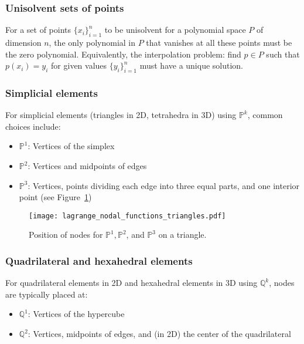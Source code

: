 \subsubsection{Unisolvent sets of points}

For a set of points $\{x_i\}_{i=1}^n$ to be unisolvent for a polynomial space $P$ of dimension $n$, the only polynomial in $P$ that vanishes at all these points must be the zero polynomial. Equivalently, the interpolation problem: find $p \in P$ such that $p(x_i) = y_i$ for given values $\{y_i\}_{i=1}^n$ must have a unique solution.

\subsubsection{Simplicial elements}

For simplicial elements (triangles in 2D, tetrahedra in 3D) using $\mathbb{P}^k$, common choices include:

\begin{itemize}
\item $\mathbb{P}^1$: Vertices of the simplex
\item $\mathbb{P}^2$: Vertices and midpoints of edges
\item $\mathbb{P}^3$: Vertices, points dividing each edge into three equal parts, and one interior point (see Figure~\ref{fig:p_nodes_2d})
\end{itemize}

\begin{figure}[!htb]
\centering
\texttt{[image: lagrange\_nodal\_functions\_triangles.pdf]}
\caption{Position of nodes for $\mathbb{P}^1, \mathbb{P}^2$, and $\mathbb{P}^3$ on a triangle.}
\label{fig:p_nodes_2d}
\end{figure}

\subsubsection{Quadrilateral and hexahedral elements}

For quadrilateral elements in 2D and hexahedral elements in 3D using $\mathbb{Q}^k$, nodes are typically placed at:

\begin{itemize}
\item $\mathbb{Q}^1$: Vertices of the hypercube
\item $\mathbb{Q}^2$: Vertices, midpoints of edges, and (in 2D) the center of the quadrilateral
\end{itemize}

